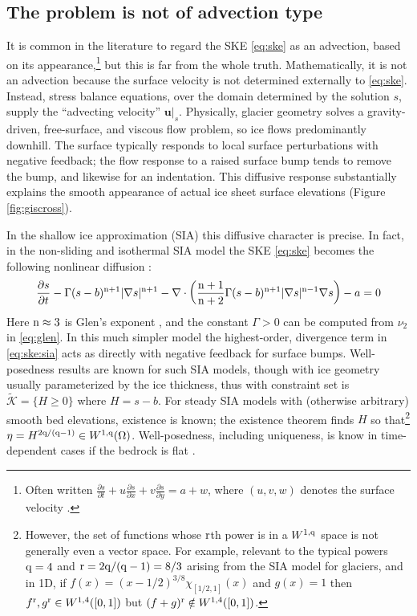 \documentclass[hidelinks,onefignum,onetabnum,final]{siamart220329}  %
\newcommand{\grad}{\nabla}
\newcommand{\Div}{\nabla\cdot}
\newcommand{\bu}{\mathbf{u}}
\newcommand{\cK}{\mathcal{K}}
\newcommand{\nn}{{\text{\textnormal{n}}}}
\newcommand{\qq}{{\text{\textnormal{q}}}}
\newcommand{\rr}{{\text{\textnormal{r}}}}
\begin{document}
\subsection{The problem is not of advection type} \label{subsec:notadv}  It is common in the literature to regard the SKE \eqref{eq:ske} as an advection, based on its appearance,\footnote{Often written $\frac{\partial s}{\partial t} + u \frac{\partial s}{\partial x} + v \frac{\partial s}{\partial y} = a + w$, where $(u,v,w)$ denotes the surface velocity \cite{GreveBlatter2009,SchoofHewitt2013}.} but this is far from the whole truth.  Mathematically, it is not an advection because the surface velocity is not determined externally to \eqref{eq:ske}.  Instead, stress balance equations, over the domain determined by the solution $s$, supply the ``advecting velocity'' $\bu|_s$.  Physically, glacier geometry solves a gravity-driven, free-surface, and viscous flow problem, so ice flows predominantly downhill.  The surface typically responds to local surface perturbations with negative feedback; the flow response to a raised surface bump tends to remove the bump, and likewise for an indentation.  This diffusive response substantially explains the smooth appearance of actual ice sheet surface elevations (Figure \ref{fig:giscross}).

In the shallow ice approximation (SIA) this diffusive character is precise.  In fact, in the non-sliding and isothermal SIA model the SKE \eqref{eq:ske} becomes the following nonlinear diffusion \cite{JouvetBueler2012}:
\begin{equation}
\frac{\partial s}{\partial t} - \Gamma (s-b)^{\nn+1} |\grad s|^{\nn+1} - \Div \left(\frac{\nn+1}{\nn+2} \Gamma (s-b)^{\nn+1} |\grad s|^{\nn-1} \grad s\right) - a = 0  \label{eq:ske:sia}
\end{equation}
Here $\nn\approx 3$ is Glen's exponent \cite{GreveBlatter2009}, and the constant $\Gamma>0$ can be computed from $\nu_2$ in \eqref{eq:glen}.  In this much simpler model the highest-order, divergence term in \eqref{eq:ske:sia} acts as directly with negative feedback for surface bumps.  Well-posedness results are known for such SIA models, though with ice geometry usually parameterized by the ice thickness, thus with constraint set is $\tilde{\cK} = \{H\ge 0\}$ where $H=s-b$.   For steady SIA models with (otherwise arbitrary) smooth bed elevations, existence is known\cite{JouvetBueler2012}; the existence theorem finds $H$ so that\footnote{However, the set of functions whose $\rr$th power is in a $W^{1,\qq}$ space is not generally even a vector space.  For example, relevant to the typical powers $\qq=4$ and $\rr=2\qq/(\qq-1)=8/3$ arising from the SIA model for glaciers, and in 1D, if $f(x)=(x-1/2)^{3/8} \chi_{[1/2,1]}(x)$ and $g(x)=1$ then $f^\rr,g^\rr \in W^{1,4}([0,1])$ but $(f+g)^\rr\notin W^{1,4}([0,1])$.} $\eta = H^{2\qq/(\qq-1)} \in W^{1,\qq}(\Omega)$.  Well-posedness, including uniqueness, is know in time-dependent cases if the bedrock is flat \cite{Calvoetal2003,PiersantiTemam2023}.
\end{document}
